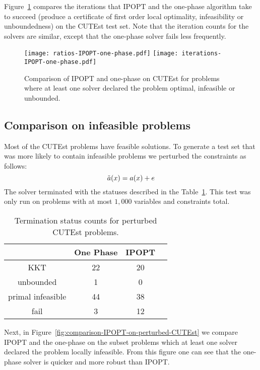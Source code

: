 \documentclass{article}
\begin{document}
Figure~\ref{fig:comparison-IPOPT-on-CUTEst} compares the iterations that IPOPT and the one-phase algorithm take to succeed (produce a certificate of first order local optimality, infeasibility or unboundedness) on the CUTEst test set. Note that the iteration counts for the solvers are similar, except that the one-phase solver fails less frequently.


\begin{figure}[H]
\texttt{[image: ratios-IPOPT-one-phase.pdf]}
\texttt{[image: iterations-IPOPT-one-phase.pdf]}
\caption{Comparison of IPOPT and one-phase on CUTEst for problems where at least one solver declared the problem optimal, infeasible or unbounded.}\label{fig:comparison-IPOPT-on-CUTEst}
\end{figure}


\subsection{Comparison on infeasible problems}\label{sec:infeas}

Most of the CUTEst problems have feasible solutions. To generate a test set that was more likely to contain infeasible problems we perturbed the constraints as follows:
$$
\tilde{a}(x) = a(x) + e
$$
The solver terminated with the statuses described in the Table~\ref{tbl:termination-status-counts-peturbed}. This test was only run on problems with at most $1,000$ variables and constraints total.
\begin{table}[H]
\caption{Termination status counts for perturbed CUTEst problems.}\label{tbl:termination-status-counts-peturbed}
\begin{tabular}{ c c c r }
 &  One Phase &  IPOPT &  \\
  \hline
KKT & 22 & 20 \\
unbounded & 1 & 0  \\
primal infeasible & 44 &  38 \\
fail & 3 & 12 \\
\end{tabular}
\end{table}

Next, in Figure~\ref{fig:comparison-IPOPT-on-perturbed-CUTEst} we compare IPOPT and the one-phase on the subset problems which at least one solver declared the problem locally infeasible. From this figure one can see that the one-phase solver is quicker and more robust than IPOPT.
\end{document}
